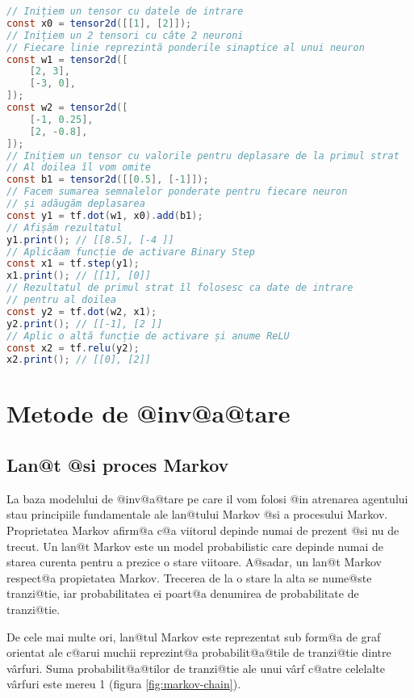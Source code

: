 \begin{lstlisting}[language=Java, caption=Exemplul 2 de folosire a bibliotecii Tensorflow., label={lst:exemple-tensor-nn}]
// Inițiem un tensor cu datele de intrare
const x0 = tensor2d([[1], [2]]);
// Inițiem un 2 tensori cu câte 2 neuroni
// Fiecare linie reprezintă ponderile sinaptice al unui neuron
const w1 = tensor2d([
    [2, 3],
    [-3, 0],
]);
const w2 = tensor2d([
    [-1, 0.25],
    [2, -0.8],
]);
// Inițiem un tensor cu valorile pentru deplasare de la primul strat
// Al doilea îl vom omite
const b1 = tensor2d([[0.5], [-1]]);
// Facem sumarea semnalelor ponderate pentru fiecare neuron
// și adăugăm deplasarea
const y1 = tf.dot(w1, x0).add(b1);
// Afișăm rezultatul
y1.print(); // [[8.5], [-4 ]]
// Aplicăam funcție de activare Binary Step
const x1 = tf.step(y1);
x1.print(); // [[1], [0]]
// Rezultatul de primul strat îl folosesc ca date de intrare
// pentru al doilea
const y2 = tf.dot(w2, x1);
y2.print(); // [[-1], [2 ]]
// Aplic o altă funcție de activare și anume ReLU
const x2 = tf.relu(y2);
x2.print(); // [[0], [2]]
\end{lstlisting}

\chapter{Metode de @inv@a@tare}

\section{Lan@t @si proces Markov}


La baza modelului de @inv@a@tare pe care il vom folosi @in atrenarea agentului stau principiile fundamentale ale lan@tului Markov @si a procesului Markov.
Proprietatea Markov afirm@a c@a viitorul depinde numai de prezent @si nu de trecut. Un lan@t Markov este un model pro\-ba\-bi\-lis\-tic care depinde numai de starea curenta pentru a prezice o stare viitoare. A@sadar, un lan@t Markov respect@a propietatea Markov.
Trecerea de la o stare la alta se nume@ste tranzi@tie, iar probabilitatea ei poart@a denumirea de probabilitate de tranzi@tie.

De cele mai multe ori, lan@tul Markov este reprezentat sub form@a de graf o\-rien\-tat ale c@arui muchii reprezint@a probabilit@a@tile de tranzi@tie dintre v\^ arfuri. Suma probabilit@a@tilor de tranzi@tie ale unui v\^ arf c@atre celelalte v\^ arfuri este mereu 1 (figura \ref{fig:markov-chain}).

